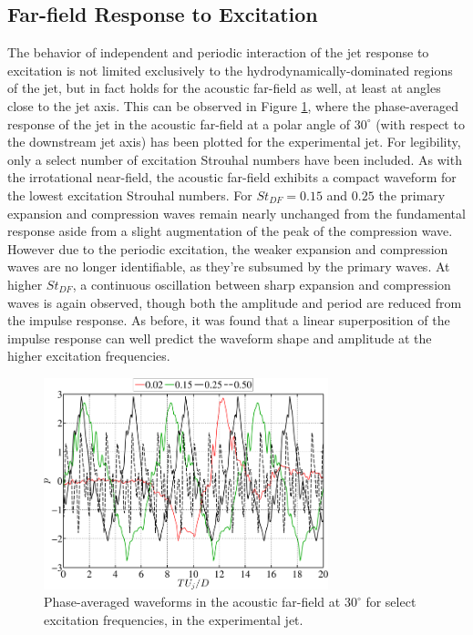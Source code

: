 \documentclass[english]{aiaa-tc}
\begin{document}
\subsection{Far-field Response to Excitation}
The behavior of independent and periodic interaction of the jet response to excitation is not limited exclusively to the hydrodynamically-dominated regions of the jet, but in fact holds for the acoustic far-field as well, at least at angles close to the jet axis. This can be observed in Figure \ref{PhavgFF1}, where the phase-averaged response of the jet in the acoustic far-field at a polar angle of $30^\circ$ (with respect to the downstream jet axis) has been plotted for the experimental jet. For legibility, only a select number of excitation Strouhal numbers have been included. As with the irrotational near-field, the acoustic far-field exhibits a compact waveform for the lowest excitation Strouhal numbers. For $St_{DF}  = 0.15$ and $0.25$ the primary expansion and compression waves remain nearly unchanged from the fundamental response aside from a slight augmentation of the peak of the compression wave. However due to the periodic excitation, the weaker expansion and compression waves are no longer identifiable, as they're subsumed by the primary waves. At higher $St_{DF}$, a continuous oscillation between sharp expansion and compression waves is again observed, though both the amplitude and period are reduced from the impulse response. As before, it was found that a linear superposition of the impulse response can well predict the waveform shape and amplitude at the higher excitation frequencies.
\begin{figure}
\begin{center}
	\includegraphics[width=3.25in]{Phase_average_FF1}
    \caption{Phase-averaged waveforms in the acoustic far-field at $30^\circ$ for select excitation frequencies, in the experimental jet.}\label{PhavgFF1}
\end{center}
\end{figure}
\end{document}
